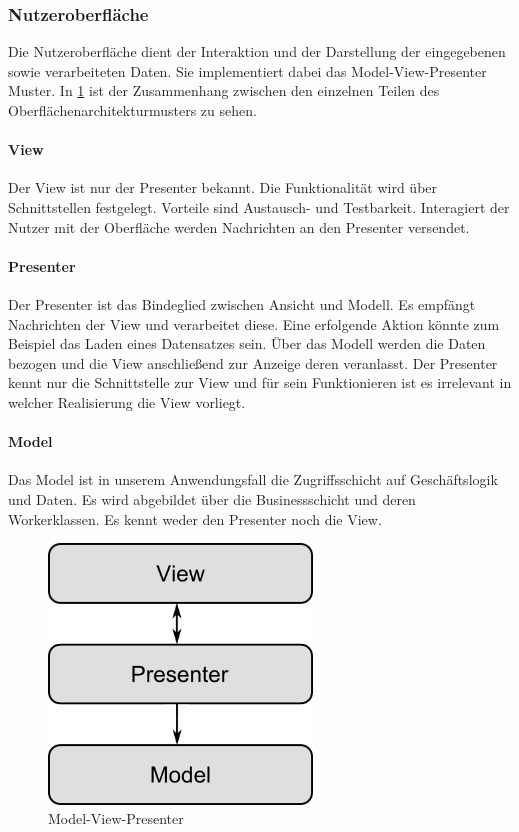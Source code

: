 \subsubsection{Nutzeroberfläche}
Die Nutzeroberfläche dient der Interaktion und der Darstellung der eingegebenen sowie verarbeiteten Daten. Sie implementiert dabei das Model-View-Presenter Muster. In \ref{mvp} ist der Zusammenhang zwischen den einzelnen Teilen des Oberflächenarchitekturmusters zu sehen.

\paragraph{View} Der View ist nur der Presenter bekannt. Die Funktionalität wird über Schnittstellen festgelegt. Vorteile sind Austausch- und Testbarkeit. Interagiert der Nutzer mit der Oberfläche werden Nachrichten an den Presenter versendet.

\paragraph{Presenter} Der Presenter ist das Bindeglied zwischen Ansicht und Modell. Es empfängt Nachrichten der View und verarbeitet diese. Eine erfolgende Aktion könnte zum Beispiel das Laden eines Datensatzes sein. Über das Modell werden die Daten bezogen und die View anschließend zur Anzeige deren veranlasst. Der Presenter kennt nur die Schnittstelle zur View und für sein Funktionieren ist es irrelevant in welcher Realisierung die View vorliegt.

\paragraph{Model} Das Model ist in unserem Anwendungsfall die Zugriffsschicht auf Geschäftslogik und Daten. Es wird abgebildet über die Businessschicht und deren Workerklassen. Es kennt weder den Presenter noch die View. 

\begin{figure}[H]
	\begin{center}
		\includegraphics[width=7cm]{Abbildungen/UML/daniel/MVP.png}
		\caption{Model-View-Presenter} 
		\label{mvp}
	\end{center}
\end{figure}

